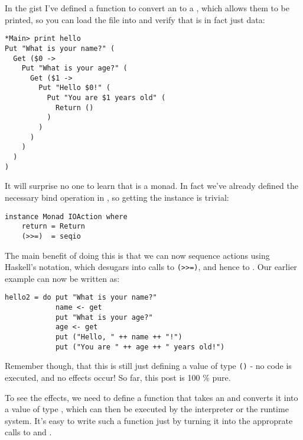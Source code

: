 \documentclass[thesis-solanki.tex]{subfiles}
\begin{document}
In the gist
 I’ve defined a function to convert an  to a , which allows them to be printed, so you can load the file into  
and verify that  is in fact just data:

\begin{verbatim}
*Main> print hello
Put "What is your name?" (
  Get ($0 -> 
    Put "What is your age?" (
      Get ($1 -> 
        Put "Hello $0!" (
          Put "You are $1 years old" (
            Return ()
          )
        )
      )
    )
  )
)
\end{verbatim}
It will surprise no one to learn that  is a monad. In fact we’ve already defined the necessary bind operation in , so getting 
the  instance is trivial:
\begin{verbatim}
instance Monad IOAction where
    return = Return
    (>>=)  = seqio
\end{verbatim}

The main benefit of doing this is that we can now sequence actions using Haskell’s
 notation, which desugars into calls to \Verb!(>>=)!, and 
hence to . Our earlier  example can now be written as:
\par
\begin{verbatim}
hello2 = do put "What is your name?"
            name <- get
            put "What is your age?"
            age <- get
            put ("Hello, " ++ name ++ "!")
            put ("You are " ++ age ++ " years old!")
\end{verbatim}
Remember though, that this is still just defining a value of type 
 \Verb!()! -
no code is executed, and no effects occur! So far, this post is 100 \% pure.

To see the effects, we need to define a function that takes an   and converts it into a value of type  , which can then be executed by the interpreter or the runtime system. It’s easy to write such a function just by turning it into the approprate calls to  and .
\end{document}
